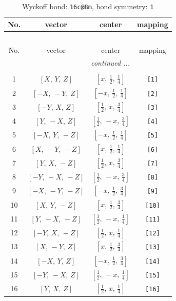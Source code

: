 \documentclass[fleqn,8pt]{jsarticle}
\begin{document}
\begin{longtable}{cccc}
\caption{Wyckoff bond: {\tt 16c@8m}, bond symmetry: {\tt 1}}
 \\
 \hline \hline
No. & vector & center & mapping \\ \hline \endfirsthead

\multicolumn{3}{l}{\tablename\ \thetable{}} \\
 \hline \hline
No. & vector & center & mapping \\ \hline \endhead

 \hline \hline
\multicolumn{3}{r}{\footnotesize\it continued ...} \\ \endfoot

 \hline \hline
\multicolumn{3}{r}{} \\ \endlastfoot

1 & $\left[ X,\, Y,\, Z \right]$ & $\left[ x,\, \frac{1}{2},\, \frac{1}{4} \right]$ & {\tt [1]} \\ \hline
2 & $\left[ - X,\, - Y,\, Z \right]$ & $\left[ - x,\, \frac{1}{2},\, \frac{1}{4} \right]$ & {\tt [2]} \\ \hline
3 & $\left[ - Y,\, X,\, Z \right]$ & $\left[ \frac{1}{2},\, x,\, \frac{3}{4} \right]$ & {\tt [3]} \\ \hline
4 & $\left[ Y,\, - X,\, Z \right]$ & $\left[ \frac{1}{2},\, - x,\, \frac{3}{4} \right]$ & {\tt [4]} \\ \hline
5 & $\left[ - X,\, Y,\, - Z \right]$ & $\left[ - x,\, \frac{1}{2},\, \frac{1}{4} \right]$ & {\tt [5]} \\ \hline
6 & $\left[ X,\, - Y,\, - Z \right]$ & $\left[ x,\, \frac{1}{2},\, \frac{1}{4} \right]$ & {\tt [6]} \\ \hline
7 & $\left[ Y,\, X,\, - Z \right]$ & $\left[ \frac{1}{2},\, x,\, \frac{3}{4} \right]$ & {\tt [7]} \\ \hline
8 & $\left[ - Y,\, - X,\, - Z \right]$ & $\left[ \frac{1}{2},\, - x,\, \frac{3}{4} \right]$ & {\tt [8]} \\ \hline
9 & $\left[ - X,\, - Y,\, - Z \right]$ & $\left[ - x,\, \frac{1}{2},\, \frac{3}{4} \right]$ & {\tt [9]} \\ \hline
10 & $\left[ X,\, Y,\, - Z \right]$ & $\left[ x,\, \frac{1}{2},\, \frac{3}{4} \right]$ & {\tt [10]} \\ \hline
11 & $\left[ Y,\, - X,\, - Z \right]$ & $\left[ \frac{1}{2},\, - x,\, \frac{1}{4} \right]$ & {\tt [11]} \\ \hline
12 & $\left[ - Y,\, X,\, - Z \right]$ & $\left[ \frac{1}{2},\, x,\, \frac{1}{4} \right]$ & {\tt [12]} \\ \hline
13 & $\left[ X,\, - Y,\, Z \right]$ & $\left[ x,\, \frac{1}{2},\, \frac{3}{4} \right]$ & {\tt [13]} \\ \hline
14 & $\left[ - X,\, Y,\, Z \right]$ & $\left[ - x,\, \frac{1}{2},\, \frac{3}{4} \right]$ & {\tt [14]} \\ \hline
15 & $\left[ - Y,\, - X,\, Z \right]$ & $\left[ \frac{1}{2},\, - x,\, \frac{1}{4} \right]$ & {\tt [15]} \\ \hline
16 & $\left[ Y,\, X,\, Z \right]$ & $\left[ \frac{1}{2},\, x,\, \frac{1}{4} \right]$ & {\tt [16]} \\
\end{longtable}
\end{document}
